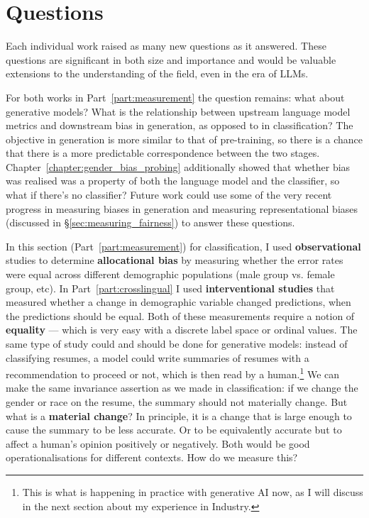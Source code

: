 \section{Questions}
Each individual work raised as many new questions as it answered.
These questions are significant in both size and importance and would be valuable extensions to the understanding of the field, even in the era of LLMs. 

For both works in Part~\ref{part:measurement} the question remains: what about generative models?  What is the relationship between upstream language model metrics and downstream bias in generation, as opposed to in classification? The objective in generation is more similar to that of pre-training, so there is a chance that there is a more predictable correspondence between the two stages. Chapter~\ref{chapter:gender_bias_probing} additionally showed that whether bias was realised was a property of both the language model and the classifier, so what if there's no classifier? 
Future work could use some of the very recent progress in measuring biases in generation and measuring representational biases (discussed in \S\ref{sec:measuring_fairness}) to answer these questions. 

In this section (Part~\ref{part:measurement}) for classification, I used \textbf{observational} studies to determine \textbf{allocational bias} by measuring whether the error rates were equal across different demographic populations (male group vs. female group, etc). In Part~\ref{part:crosslingual} I used \textbf{interventional studies} that measured whether a change in demographic variable changed predictions, when the predictions should be equal. Both of these measurements require a notion of \textbf{equality} --- which is very easy with a discrete label space or ordinal values. The same type of study could and should be done for generative models: instead of classifying resumes, a model could write summaries of resumes with a recommendation to proceed or not, which is then read by a human.\footnote{This is what is happening in practice with generative AI now, as I will discuss in the next section about my experience in Industry.} We can make the same invariance assertion as we made in classification: if we change the gender or race on the resume, the summary should not materially change. But what is a \textbf{material change}? In principle, it is a change that is large enough to cause the summary to be less accurate. Or to be equivalently accurate but to affect a human's opinion positively or negatively. Both would be good operationalisations for different contexts. How do we measure this? 

